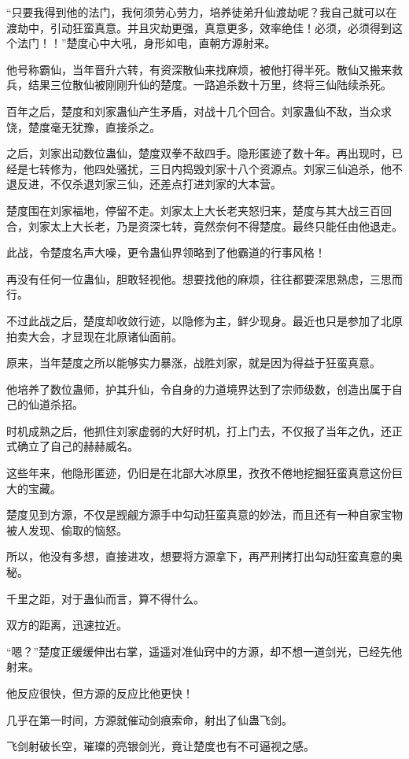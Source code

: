 \begin{this_body}
“只要我得到他的法门，我何须劳心劳力，培养徒弟升仙渡劫呢？我自己就可以在渡劫中，引动狂蛮真意。并且灾劫更强，真意更多，效率绝佳！必须，必须得到这个法门！！”楚度心中大吼，身形如电，直朝方源射来。

他号称霸仙，当年晋升六转，有资深散仙来找麻烦，被他打得半死。散仙又搬来救兵，结果三位散仙被刚刚升仙的楚度。一路追杀数十万里，终将三仙陆续杀死。

百年之后，楚度和刘家蛊仙产生矛盾，对战十几个回合。刘家蛊仙不敌，当众求饶，楚度毫无犹豫，直接杀之。

之后，刘家出动数位蛊仙，楚度双拳不敌四手。隐形匿迹了数十年。再出现时，已经是七转修为，他四处骚扰，三日内捣毁刘家十八个资源点。刘家三仙追杀，他不退反进，不仅杀退刘家三仙，还差点打进刘家的大本营。

楚度围在刘家福地，停留不走。刘家太上大长老夹怒归来，楚度与其大战三百回合，刘家太上大长老，乃是资深七转，竟然奈何不得楚度。最终只能任由他退走。

此战，令楚度名声大噪，更令蛊仙界领略到了他霸道的行事风格！

再没有任何一位蛊仙，胆敢轻视他。想要找他的麻烦，往往都要深思熟虑，三思而行。

不过此战之后，楚度却收敛行迹，以隐修为主，鲜少现身。最近也只是参加了北原拍卖大会，才显现在北原诸仙面前。

原来，当年楚度之所以能够实力暴涨，战胜刘家，就是因为得益于狂蛮真意。

他培养了数位蛊师，护其升仙，令自身的力道境界达到了宗师级数，创造出属于自己的仙道杀招。

时机成熟之后，他抓住刘家虚弱的大好时机，打上门去，不仅报了当年之仇，还正式确立了自己的赫赫威名。

这些年来，他隐形匿迹，仍旧是在北部大冰原里，孜孜不倦地挖掘狂蛮真意这份巨大的宝藏。

楚度见到方源，不仅是觊觎方源手中勾动狂蛮真意的妙法，而且还有一种自家宝物被人发现、偷取的恼怒。

所以，他没有多想，直接进攻，想要将方源拿下，再严刑拷打出勾动狂蛮真意的奥秘。

千里之距，对于蛊仙而言，算不得什么。

双方的距离，迅速拉近。

“嗯？”楚度正缓缓伸出右掌，遥遥对准仙窍中的方源，却不想一道剑光，已经先他射来。

他反应很快，但方源的反应比他更快！

几乎在第一时间，方源就催动剑痕索命，射出了仙蛊飞剑。

飞剑射破长空，璀璨的亮银剑光，竟让楚度也有不可逼视之感。


\end{this_body}
